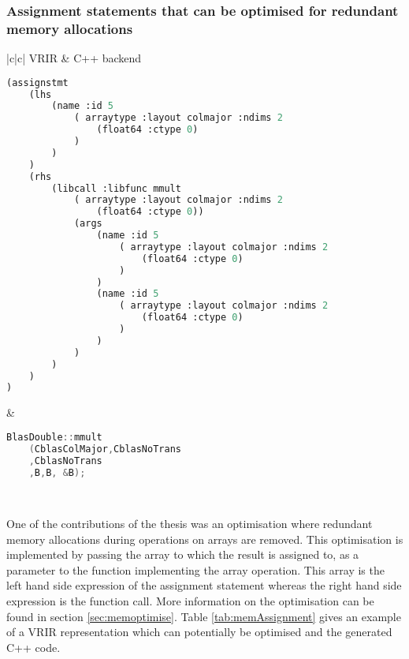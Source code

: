 \subsubsection{Assignment statements that can be optimised  for redundant memory allocations}
\begin{table}[htbp]
\begin{tabular}{|c|c|}
\hline 
VRIR & C++ backend \\
\hline 
{
\begin{lstlisting}[language=lisp, frame=none, numbers=none]
(assignstmt
	(lhs
		(name :id 5
   			( arraytype :layout colmajor :ndims 2
				(float64 :ctype 0)
			)
		)
	)
	(rhs
		(libcall :libfunc mmult
			( arraytype :layout colmajor :ndims 2
				(float64 :ctype 0))
			(args
   				(name :id 5
   					( arraytype :layout colmajor :ndims 2
						(float64 :ctype 0)
					)
				)
				(name :id 5
					( arraytype :layout colmajor :ndims 2
						(float64 :ctype 0)
					)
				)
			)
		)
	)
)
\end{lstlisting}
} & 
{
\begin{lstlisting}[language=c,frame=none, numbers=none]
BlasDouble::mmult
	(CblasColMajor,CblasNoTrans
	,CblasNoTrans
	,B,B, &B);
\end{lstlisting}
} \\
\hline
\end{tabular}
\caption[Assignment with Memory optimisation]{Table shows VRIR with array operations on the LHS and the equivalent C++ code that is generated and optimised.}
\label{tab:memAssignment}
\end{table}
One of the contributions of the thesis was an optimisation where redundant memory allocations during operations on arrays are removed. This optimisation is implemented by passing the array to which the result is assigned to, as a parameter to the function implementing the array operation. This array is the left hand side expression of the assignment statement whereas the right hand side expression is the function call. More information on the optimisation can be found in section \ref{sec:memoptimise}. Table \ref{tab:memAssignment} gives an example of a VRIR representation which can potentially be optimised and the generated C++ code. 

